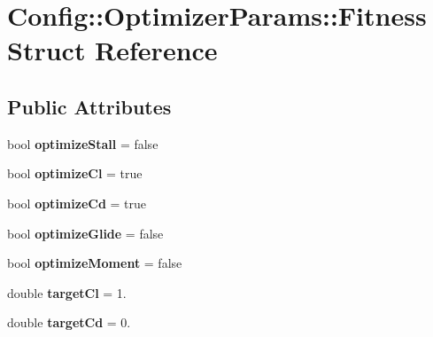 \hypertarget{struct_config_1_1_optimizer_params_1_1_fitness}{}\section{Config\+:\+:Optimizer\+Params\+:\+:Fitness Struct Reference}
\label{struct_config_1_1_optimizer_params_1_1_fitness}
\subsection*{Public Attributes}
\begin{DoxyCompactItemize}
\item 
\hypertarget{struct_config_1_1_optimizer_params_1_1_fitness_a200cf3c64e202394decaec34d89bd280}{}\label{struct_config_1_1_optimizer_params_1_1_fitness_a200cf3c64e202394decaec34d89bd280} 
bool {\bfseries optimize\+Stall} = false
\item 
\hypertarget{struct_config_1_1_optimizer_params_1_1_fitness_afbb10a58397284eeabc89a951ee3d467}{}\label{struct_config_1_1_optimizer_params_1_1_fitness_afbb10a58397284eeabc89a951ee3d467} 
bool {\bfseries optimize\+Cl} = true
\item 
\hypertarget{struct_config_1_1_optimizer_params_1_1_fitness_a8175a4e1d6d67dee007591263c78053b}{}\label{struct_config_1_1_optimizer_params_1_1_fitness_a8175a4e1d6d67dee007591263c78053b} 
bool {\bfseries optimize\+Cd} = true
\item 
\hypertarget{struct_config_1_1_optimizer_params_1_1_fitness_a9cade69b8a94f7400d0136d85f84832e}{}\label{struct_config_1_1_optimizer_params_1_1_fitness_a9cade69b8a94f7400d0136d85f84832e} 
bool {\bfseries optimize\+Glide} = false
\item 
\hypertarget{struct_config_1_1_optimizer_params_1_1_fitness_ac5978cb103bc4761ddb8411edf237ba7}{}\label{struct_config_1_1_optimizer_params_1_1_fitness_ac5978cb103bc4761ddb8411edf237ba7} 
bool {\bfseries optimize\+Moment} = false
\item 
\hypertarget{struct_config_1_1_optimizer_params_1_1_fitness_a01359bf3a0aff54006267de6e52301b8}{}\label{struct_config_1_1_optimizer_params_1_1_fitness_a01359bf3a0aff54006267de6e52301b8} 
double {\bfseries target\+Cl} = 1.
\item 
\hypertarget{struct_config_1_1_optimizer_params_1_1_fitness_ab41096bb4d5ea5bf319e7d9db250d081}{}\label{struct_config_1_1_optimizer_params_1_1_fitness_ab41096bb4d5ea5bf319e7d9db250d081} 
double {\bfseries target\+Cd} = 0.

\end{DoxyCompactItemize}
